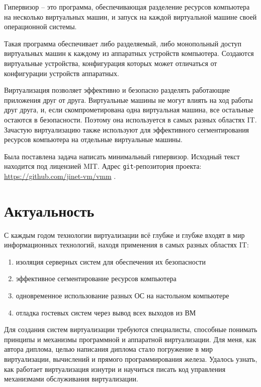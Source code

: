 \documentclass[a4paper,11pt]{extarticle}
\begin{document}
	Гипервизор -- это программа, обеспечивающая разделение ресурсов компьютера на несколько виртуальных машин, и запуск на каждой виртуальной машине своей операционной системы. \par
	Такая программа обеспечивает либо разделяемый, либо монопольный доступ виртуальных машин к каждому из аппаратных устройств компьютера. Создаются виртуальные устройства, конфигурация которых может отличаться от конфигурации устройств аппаратных.\par
	Виртуализация позволяет эффективно и безопасно разделять работающие приложения друг от друга. Виртуальные машины не могут влиять на ход работы друг друга, и, если скомпрометирована одна виртуальная машина, все остальные остаются в безопасности. Поэтому она используется в самых разных областях IT. Зачастую виртуализацию также используют для эффективного сегментирования ресурсов компьютера на отдельные виртуальные машины.\par
	Была поставлена задача написать минимальный гипервизор. Исходный текст находится под лицензией MIT. Адрес \texttt{git}-репозитория проекта: \url{https://github.com/jinet-vm/vmm} .\par
	\section{Актуальность}
	С каждым годом технологии виртуализации всё глубже и глубже входят в мир информационных технологий, находя применения в самых разных областях IT:
	\begin{enumerate}
		\item изоляция серверных систем для обеспечения их безопасности
		\item эффективное сегментирование ресурсов компьютера
		\item одновременное использование разных ОС на настольном компьютере
		\item отладка гостевых систем через вывод всех выходов из ВМ
	\end{enumerate}
	\par Для создания систем виртуализации требуются специалисты, способные понимать принципы и механизмы программной и аппаратной виртуализации. Для меня, как автора диплома, целью написания диплома стало погружение в мир виртуализации, вычислений и прямого программирования железа. Удалось узнать, как работает виртуализация изнутри и научиться писать код управления механизмами обслуживания виртуализации. \par
\end{document}
